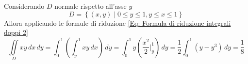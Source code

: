 \begin{example}
\begin{equation*}
    \end{equation*}
    Considerando $D$ normale rispetto all'asse $y$
    \begin{equation*}
        D= \left\{(x,y) \mid 0 \leq y \leq 1, y \leq x \leq 1 \right\}
    \end{equation*}
    Allora applicando le formule di riduzione \eqref{Eq: Formula di riduzione integrali doppi 2}
    \begin{equation*}
        \iint\limits_D{xy}\,dx\,dy= \int_{0}^{1}{\left(\int_{y}^{1}{xy\,dx}\right)}\,dy = \int_{0}^{1}{y\left( \frac{x^2}{2}\Big|_{y}^1 \right)}\,dy= \frac{1}{2}\int_{0}^{1}{\left(y-y^3\right)}\,dy= \frac{1}{8}
    \end{equation*}
\end{example}

